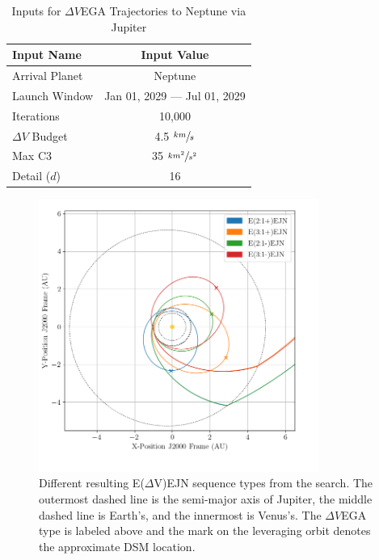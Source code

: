 \documentclass[letterpaper, preprint, paper,11pt]{AAS}	%
\begin{document}
\begin{table}[h]
    \begin{center}
        \caption{Inputs for $\Delta V$EGA Trajectories to Neptune via Jupiter}
        \label{tab:tritonInputs}
        \begin{tabular}{l|c}
					\toprule
            \textbf{Input Name} & \textbf{Input Value}\\
            \hline
            Arrival Planet & Neptune \\
            Launch Window \quad \quad & Jan 01, 2029 --- Jul 01, 2029 \\
            Iterations & 10,000 \\
            $\Delta V$ Budget & 4.5 $\sfrac{km}{s}$ \\
            Max C3 & 35 $\sfrac{km^2}{s^2}$ \\
            Detail ($d$) & 16 \\
						\bottomrule
        \end{tabular}
    \end{center}
\end{table}
%
\begin{figure}[ht]
	\centering\includegraphics[width=3.6in]{./fig/tridentMCTS}
	\caption{Different resulting E($\Delta$V)EJN sequence types from the search. The outermost dashed line is the semi-major axis of Jupiter, the middle dashed line is Earth's, and the innermost is Venus's. The $\Delta V$EGA type is labeled above and the mark on the leveraging orbit denotes the approximate DSM location.}
	\label{fig:tridentMCTS}
\end{figure}
\end{document}
